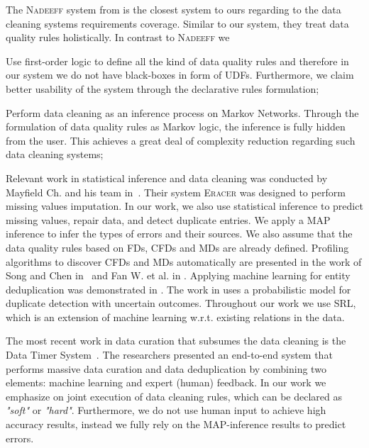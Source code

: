 The \textsc{Nadeeff} system from \cite{Dallachiesa:2013:NCD:2463676.2465327} is the closest system to ours regarding to the data cleaning systems requirements coverage. Similar to our system, they treat data quality rules holistically. In contrast to \textsc{Nadeeff} we 
\begin{inparaenum}[\itshape 1\upshape)]
	\item Use first-order logic to define all the kind of data quality rules and therefore in our system we do not have black-boxes in form of UDFs. Furthermore, we claim better usability of the system through the declarative rules formulation;
	\item Perform data cleaning as an inference process on Markov Networks. Through the formulation of data quality rules as Markov logic, the inference is fully hidden from the user. This achieves a great deal of complexity reduction regarding such data cleaning systems;
\end{inparaenum}  

Relevant work in statistical inference and data cleaning was conducted by Mayfield Ch. and his team in~\cite{Mayfield:2010:EDA:1807167.1807178}. Their system \textsc{Eracer} was designed to perform missing values imputation. In our work, we also use statistical inference to predict missing values, repair data, and detect duplicate entries. We apply a MAP inference to infer the types of errors and their sources. We also assume that the data quality rules based on FDs, CFDs and MDs are already defined. Profiling algorithms to discover CFDs and MDs automatically are presented in the work of Song and Chen in~\cite{song2009discovering} and Fan W. et al. in \cite{Fan:2011:DCF:1978258.1978514}. Applying machine learning for entity deduplication was demonstrated in \cite{guo2010record}. The work in \cite{beskales2010probclean} uses a probabilistic model for duplicate detection with uncertain outcomes. Throughout our work we use SRL, which is an extension of machine learning w.r.t. existing relations in the data.

The most recent work in data curation that subsumes the data cleaning is the Data Timer System~\cite{Stonebraker_datacuration}. The researchers presented an end-to-end system that performs massive data curation and data deduplication by combining two elements: machine learning and expert (human) feedback. In our work we emphasize on joint execution of data cleaning rules, which can be declared as \textit{"soft"} or \textit{"hard"}. Furthermore, we do not use human input to achieve high accuracy results, instead we fully rely on the MAP-inference results to predict errors. 


